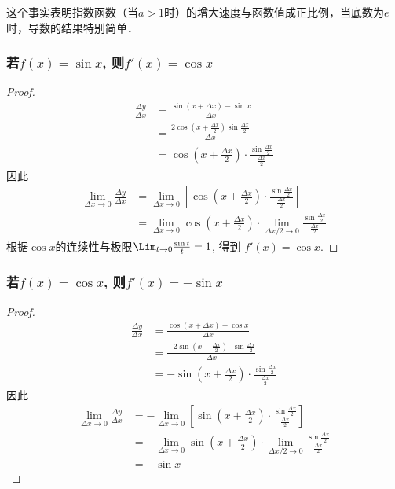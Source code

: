 这个事实表明指数函数（当$a>1$时）的增大速度与函数值成正比例，当底数为$e$时，导数的结果特别简单．


\subsubsection{若$f(x)=\sin x$, 则$f'(x)=\cos x$}
\begin{proof}
    \begin{align*}
\frac{\Delta y}{\Delta x}&=\frac{\sin(x+\Delta x)-\sin x}{\Delta x}\\
&=\frac{2\cos\left(x+\frac{\Delta x}{2}\right)\sin\frac{\Delta x}{2}}{\Delta x}\\
&=\cos\left(x+\frac{\Delta x}{2}\right)\cdot \frac{\sin\frac{\Delta x}{2}}{\frac{\Delta x}{2}}
    \end{align*}
因此
\begin{align*}
    \lim_{\Delta x\to 0}\frac{\Delta y}{\Delta x}&=\lim_{\Delta x\to 0}\left[\cos\left(x+\frac{\Delta x}{2}\right)\cdot \frac{\sin\frac{\Delta x}{2}}{\frac{\Delta x}{2}}\right]\\
    &=\lim_{\Delta x\to 0}\cos\left(x+\frac{\Delta x}{2}\right)\cdot \lim_{\Delta x/2\to 0}\frac{\sin\frac{\Delta x}{2}}{\frac{\Delta x}{2}}
\end{align*}
根据$\cos x$的连续性与极限$\Lim_{t\to 0}\frac{\sin t}{t}=1$, 得到
$f' (x) =\cos x$.
\end{proof}

\subsubsection{若$f(x)=\cos x$, 则$f'(x)=-\sin x$}
\begin{proof}
\begin{align*}
\frac{\Delta y}{\Delta x}&=\frac{\cos(x+\Delta x)-\cos x}{\Delta x}\\
&=\frac{-2\sin\left(x+\frac{\Delta x}{2}\right)\cdot \sin\frac{\Delta x}{2}}{\Delta x}\\
&=-\sin\left(x+\frac{\Delta x}{2}\right)\cdot \frac{\sin\frac{\Delta x}{2}}{\frac{\Delta x}{2}}
    \end{align*}
因此
\begin{align*}
    \lim_{\Delta x\to 0}\frac{\Delta y}{\Delta x}&=-\lim_{\Delta x\to 0}\left[\sin\left(x+\frac{\Delta x}{2}\right)\cdot \frac{\sin\frac{\Delta x}{2}}{\frac{\Delta x}{2}}\right]\\
    &=-\lim_{\Delta x\to 0}\sin\left(x+\frac{\Delta x}{2}\right)\cdot \lim_{\Delta x/2\to 0}\frac{\sin\frac{\Delta x}{2}}{\frac{\Delta x}{2}}\\
    &=-\sin  x
\end{align*}
\end{proof}

